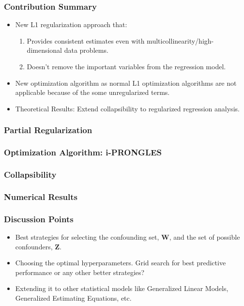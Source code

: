 \documentclass{beamer}
\begin{document}
\begin{frame}
	\frametitle{Contribution Summary}
	\begin{itemize}
		\item New L1 regularization approach that:
			\begin{enumerate}
				\item Provides consistent estimates even with
					multicollinearity/high-dimensional data
					problems.
				\item Doesn't remove the important variables
					from the regression model.
			\end{enumerate}
		\item New optimization algorithm as normal L1 optimization algorithms are not applicable because of the some unregularized terms.
		\item Theoretical Results: Extend collapsibility to regularized regression analysis.
	\end{itemize}
\end{frame}

\begin{frame}
	\frametitle{Partial Regularization}

\end{frame}

\begin{frame}
	\frametitle{Optimization Algorithm: i-PRONGLES}
\end{frame}

\begin{frame}
	\frametitle{Collapsibility}
\end{frame}

\begin{frame}
	\frametitle{Numerical Results}
\end{frame}

\begin{frame}
	\frametitle{Discussion Points}
	\begin{itemize}
		\item Best strategies for selecting the confounding set, $
			\bm{W} $, and the set of possible confounders, $ \bm{Z} $.
		\item Choosing the optimal hyperparameters. Grid search for best 
			predictive performance or any other better strategies?
		\item Extending it to other statistical models like Generalized
			Linear Models, Generalized Estimating Equations, etc.
	\end{itemize}
\end{frame}
\end{document}
